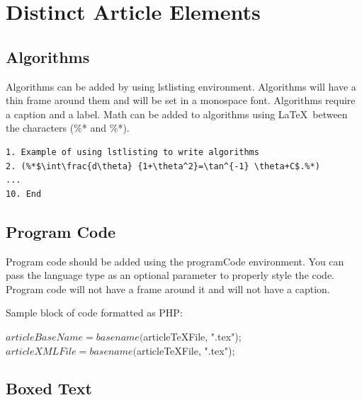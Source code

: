 \documentclass[hasAbstract,authorBox]{csmagazine}
\begin{document}

\pagebreak


\section{Distinct Article Elements}

\subsection{Algorithms}

Algorithms can be added by using lstlisting environment. Algorithms will have a thin frame around them and will be set in a monospace font. Algorithms require a caption and a label. Math can be added to algorithms using \LaTeX\ between the characters (\%* and \%*).


\begin{lstlisting}[caption={Add a caption for your algorithm here.}, label=Algorithm1]
1. Example of using lstlisting to write algorithms
2. (%*$\int\frac{d\theta} {1+\theta^2}=\tan^{-1} \theta+C$.%*)
...
10. End
\end{lstlisting}

\subsection{Program Code}

Program code should be added using the programCode environment. You can pass the language type as an optional parameter to properly style the code. Program code will not have a frame around it and will not have a caption.

Sample block of code formatted as PHP:

\begin{programCode}
[language=PhP]
$articleBaseName = basename($articleTeXFile, ".tex");
$articleXMLFile = basename($articleTeXFile, ".tex");
\end{programCode}


\subsection{Boxed Text}

\end{document}
